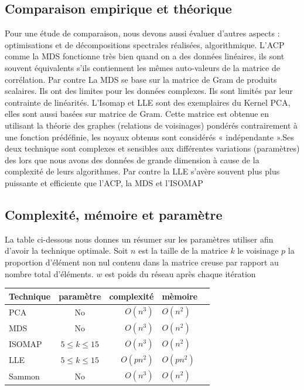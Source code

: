 \documentclass[twoside,twocolumn]{article}
\begin{document}
\subsection{Comparaison empirique et théorique}

Pour une étude de comparaison, nous devons aussi évaluer d’autres aspects : optimisations et de décompositions spectrales réalisées, algorithmique.
L’ACP comme la MDS fonctionne très bien quand on a des données linéaires, ils sont souvent équivalents s’ils contiennent les mêmes auto-valeurs de la matrice de corrélation. Par contre La MDS se base sur la matrice de Gram de produits scalaires. 
Ils ont des limites pour les données complexes.  Ils sont limités par  leur contrainte de linéarités.
L’Isomap et LLE sont des exemplaires du Kernel PCA, elles sont aussi basées sur  matrice de Gram. Cette matrice est obtenue en utilisant la  théorie des graphes (relations de voisinages) pondérés contrairement à une fonction prédéfinie, les noyaux obtenus sont considérés « indépendante ».Ses deux technique sont complexes et sensibles aux  différentes variations (paramètres) des lors que nous avons des données de grande dimension à cause de la complexité de leurs algorithmes. Par contre la LLE s’avère souvent plus plus puissante et efficiente que l’ACP, la MDS et l’ISOMAP

\subsection{Complexité,  mémoire et paramètre}
La table ci-dessous nous donnes un résumer sur les paramètres utiliser afin d’avoir la technique optimale. Soit $n$ est la taille de la matrice $k$ le voisinage $p$ la proportion d’élément non nul contenu dans la matrice creuse par rapport au nombre total d’éléments. $w$ est poids du réseau après chaque itération \cite{Maaten08} \\

\begin{tabular}{|l|c|r|l|c|}
  \hline
  Technique & paramètre   & complexité & mèmoire\\
  \hline
  PCA & No & $O(n^3)$ & $O(n^2)$\\
  MDS & No  & $O(n^3)$ & $O(n^2)$\\
  ISOMAP & $ 5 \le k \le 15 $ & $O(n^3)$ & $O(n^2)$\\
  LLE & $5 \le k \le 15$  &  $O(pn^2)$ & $O(pn^2)$\\
  Sammon& No  & $O(n^3)$ & $O(n^2)$ \\
  \hline
\end{tabular}
\\
\end{document}
